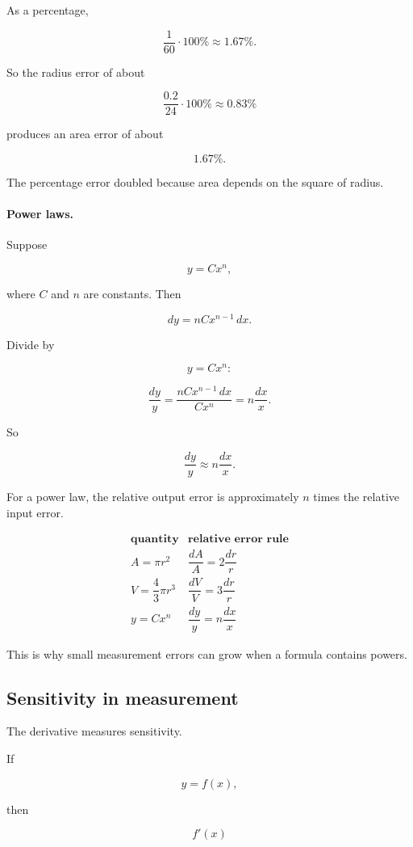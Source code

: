 As a percentage,

\[
\frac{1}{60}\cdot100\%
\approx
1.67\%.
\]

So the radius error of about

\[
\frac{0.2}{24}\cdot100\%\approx0.83\%
\]

produces an area error of about

\[
1.67\%.
\]

The percentage error doubled because area depends on the square of radius.

\paragraph{Power laws.}
Suppose

\[
y=Cx^n,
\]

where \(C\) and \(n\) are constants.  Then

\[
dy=nCx^{n-1}\,dx.
\]

Divide by

\[
y=Cx^n:
\]

\[
\frac{dy}{y}
=
\frac{nCx^{n-1}\,dx}{Cx^n}
=
n\frac{dx}{x}.
\]

So

\[
\boxed{
\frac{dy}{y}\approx n\frac{dx}{x}.
}
\]

For a power law, the relative output error is approximately \(n\) times the relative
input error.

\[
\begin{array}{c|c}
\textbf{quantity} & \textbf{relative error rule} \\ \hline
A=\pi r^2 & \dfrac{dA}{A}=2\dfrac{dr}{r} \\[8pt]
V=\dfrac43\pi r^3 & \dfrac{dV}{V}=3\dfrac{dr}{r} \\[8pt]
y=Cx^n & \dfrac{dy}{y}=n\dfrac{dx}{x}
\end{array}
\]

This is why small measurement errors can grow when a formula contains powers.

\subsection{Sensitivity in measurement}
\label{subsec:sensitivity-in-measurement}

The derivative measures sensitivity.

If

\[
y=f(x),
\]

then

\[
f'(x)
\]

